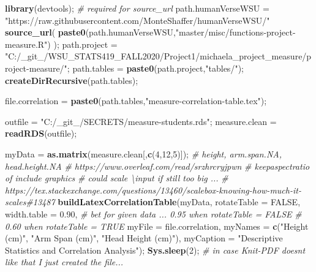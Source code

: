 \documentclass[]{article}
\newenvironment{Shaded}{\begin{snugshade}}{\end{snugshade}}
\newcommand{\CommentTok}[1]{\textcolor[rgb]{0.56,0.35,0.01}{\textit{#1}}}
\newcommand{\DataTypeTok}[1]{\textcolor[rgb]{0.13,0.29,0.53}{#1}}
\newcommand{\DecValTok}[1]{\textcolor[rgb]{0.00,0.00,0.81}{#1}}
\newcommand{\FloatTok}[1]{\textcolor[rgb]{0.00,0.00,0.81}{#1}}
\newcommand{\KeywordTok}[1]{\textcolor[rgb]{0.13,0.29,0.53}{\textbf{#1}}}
\newcommand{\NormalTok}[1]{#1}
\newcommand{\OtherTok}[1]{\textcolor[rgb]{0.56,0.35,0.01}{#1}}
\newcommand{\StringTok}[1]{\textcolor[rgb]{0.31,0.60,0.02}{#1}}
\begin{document}
\begin{Shaded}
\begin{Highlighting}[]
\KeywordTok{library}\NormalTok{(devtools);       }\CommentTok{\# required for source\_url}
\NormalTok{path.humanVerseWSU =}\StringTok{ "https://raw.githubusercontent.com/MonteShaffer/humanVerseWSU/"}
\KeywordTok{source\_url}\NormalTok{( }\KeywordTok{paste0}\NormalTok{(path.humanVerseWSU,}\StringTok{"master/misc/functions{-}project{-}measure.R"}\NormalTok{) );}
\NormalTok{path.project =}\StringTok{ "C:/\_git\_/WSU\_STATS419\_FALL2020/Project1/michaela\_project\_measure/project{-}measure/"}\NormalTok{;}
\NormalTok{path.tables =}\StringTok{ }\KeywordTok{paste0}\NormalTok{(path.project,}\StringTok{"tables/"}\NormalTok{);}
  \KeywordTok{createDirRecursive}\NormalTok{(path.tables);}


\NormalTok{file.correlation =}\StringTok{ }\KeywordTok{paste0}\NormalTok{(path.tables,}\StringTok{"measure{-}correlation{-}table.tex"}\NormalTok{);}

\NormalTok{outfile =}\StringTok{ "C:/\_git\_/SECRETS/measure{-}students.rds"}\NormalTok{;}
\NormalTok{measure.clean =}\StringTok{ }\KeywordTok{readRDS}\NormalTok{(outfile);}

\NormalTok{myData =}\StringTok{ }\KeywordTok{as.matrix}\NormalTok{(measure.clean[,}\KeywordTok{c}\NormalTok{(}\DecValTok{4}\NormalTok{,}\DecValTok{12}\NormalTok{,}\DecValTok{5}\NormalTok{)]);}
\CommentTok{\# height, arm.span.NA, head.height.NA}
\CommentTok{\# https://www.overleaf.com/read/srzhrcryjpwn}
\CommentTok{\# keepaspectratio of include graphics }
\CommentTok{\# could scale \textbackslash{}input if still too big ...}
\CommentTok{\# https://tex.stackexchange.com/questions/13460/scalebox{-}knowing{-}how{-}much{-}it{-}scales\#13487}
\KeywordTok{buildLatexCorrelationTable}\NormalTok{(myData, }
  \DataTypeTok{rotateTable =} \OtherTok{FALSE}\NormalTok{,}
  \DataTypeTok{width.table =} \FloatTok{0.90}\NormalTok{, }\CommentTok{\# bet for given data ... 0.95 when rotateTable = FALSE}
                      \CommentTok{\# 0.60 when rotateTable = TRUE}
  \DataTypeTok{myFile =}\NormalTok{ file.correlation,}
  \DataTypeTok{myNames =} \KeywordTok{c}\NormalTok{(}\StringTok{"Height (cm)"}\NormalTok{, }\StringTok{"Arm Span (cm)"}\NormalTok{, }\StringTok{"Head Height (cm)"}\NormalTok{),}
  \DataTypeTok{myCaption =} \StringTok{"Descriptive Statistics and Correlation Analysis"}\NormalTok{);}
\KeywordTok{Sys.sleep}\NormalTok{(}\DecValTok{2}\NormalTok{); }\CommentTok{\# in case Knit{-}PDF doesn\textquotesingle{}t like that I just created the file...}
\end{Highlighting}
\end{Shaded}
\end{document}

